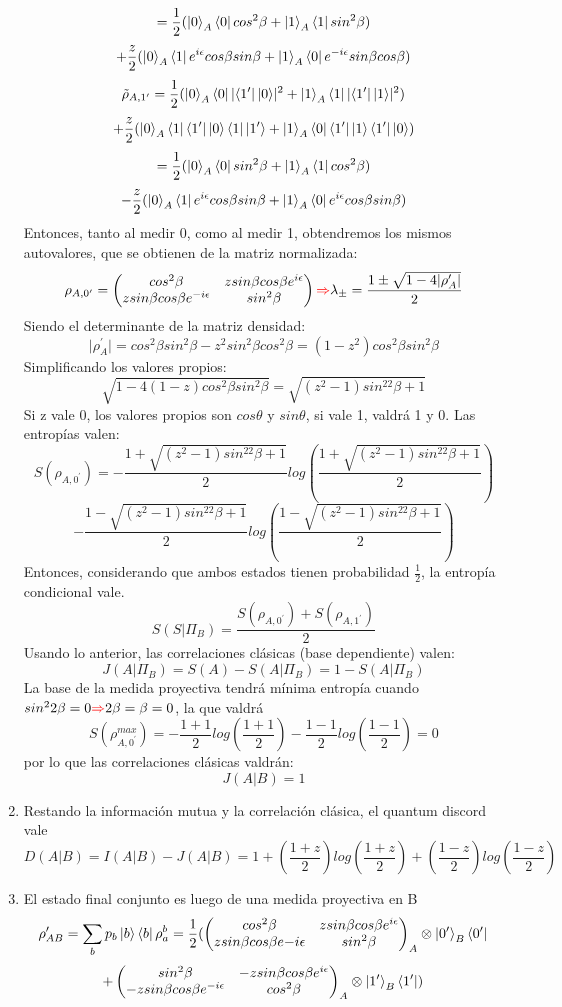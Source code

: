 \documentclass{book}
\begin{document}
\begin{enumerate}
       $$=\frac{1}{2}(\ket{0}_A\bra{0}cos^2\beta+\ket{1}_A\bra{1}sin^2\beta)$$ $$+\frac{z}{2}(\ket{0}_A\bra{1}e^{i\epsilon}cos\beta sin\beta+\ket{1}_A\bra{0}e^{-i\epsilon}sin\beta cos\beta)$$
    $$\Tilde{\rho}_{A,1^\prime}=\frac{1}{2}(\ket{0}_A\bra{0}\lvert\bra{1^\prime}\ket{0}\rvert^2+\ket{1}_A\bra{1}\lvert\bra{1^\prime}\ket{1}\rvert^2)$$ $$+\frac{z}{2}(\ket{0}_A\bra{1}\bra{1^\prime}\ket{0}\bra{1}\ket{1^\prime}+\ket{1}_A\bra{0}\bra{1^\prime}\ket{1}\bra{1^\prime}\ket{0})$$
    $$=\frac{1}{2}(\ket{0}_A\bra{0}sin^2\beta+\ket{1}_A\bra{1}cos^2\beta)$$ $$-\frac{z}{2}(\ket{0}_A\bra{1}e^{i\epsilon}cos\beta sin\beta+\ket{1}_A\bra{0}e^{i\epsilon}cos\beta sin\beta)$$
    Entonces, tanto al medir 0, como al medir 1, obtendremos los mismos autovalores, que se obtienen de la matriz normalizada: 
    $$ \rho_{A,0^\prime}= \begin{pmatrix} cos^2 \beta& zsin\beta cos\beta e^{i\epsilon} \\ z sin\beta cos\beta e^{-i\epsilon} & sin^2\beta\end{pmatrix}\textcolor{red}{\Rightarrow} \lambda_\pm=\frac{1\pm\sqrt{1-4\lvert\rho^\prime_A\rvert}}{2}$$
    Siendo el determinante de la matriz densidad:
    $$ \lvert\rho^\prime_A\rvert=cos^2\beta sin^2\beta-z^2sin^2\beta cos^2\beta=(1-z^2)cos^2\beta sin^2\beta$$ Simplificando los valores propios: $$ \sqrt{1-4(1-z)cos^2\beta sin^2\beta}=\sqrt{(z^2-1)sin^22\beta+1}$$
    Si z vale 0, los valores propios son $cos\theta$ y $sin\theta$, si vale 1, valdrá 1 y 0. Las entropías valen: $$S(\rho_{A,0^\prime})=-\frac{1+\sqrt{(z^2-1)sin^22\beta+1}}{2}log(\frac{1+\sqrt{(z^2-1)sin^22\beta+1}}{2})$$ $$-\frac{1-\sqrt{(z^2-1)sin^22\beta+1}}{2}log(\frac{1-\sqrt{(z^2-1)sin^22\beta+1}}{2}) $$
    Entonces, considerando que ambos estados tienen probabilidad $\frac{1}{2}$, la entropía condicional vale. $$S(S|\Pi_B)=\frac{S(\rho_{A,0^\prime})+S(\rho_{A,1^\prime})}{2}$$
    Usando lo anterior, las correlaciones clásicas (base dependiente) valen: 
    $$J(A|\Pi_B)=S(A)-S(A|\Pi_B)=1-S(A|\Pi_B)$$ 
    La base de la medida proyectiva tendrá mínima entropía cuando $sin^2 2\beta=0 \textcolor{red}{\Rightarrow} 2\beta=\beta=0$, la que valdrá
    $$S(\rho_{A,0^\prime}^{max})=-\frac{1+1}{2}log(\frac{1+1}{2})-\frac{1-1}{2}log(\frac{1-1}{2})=0$$por lo que las correlaciones clásicas valdrán:
    $$J(A|B)=1$$
    \item Restando la información mutua y la correlación clásica, el quantum discord vale $$D(A|B)=I(A|B)-J(A|B)=1+(\frac{1+z}{2})log(\frac{1+z}{2})+(\frac{1-z}{2})log(\frac{1-z}{2})$$ 
    \item El estado final conjunto es luego de una medida proyectiva en B $$\rho^\prime_{AB}=\sum_b p_b \ket{b}\bra{b}\rho_a^b=\frac{1}{2}(\begin{pmatrix}cos^2\beta&zsin\beta cos\beta e^{i\epsilon}\\zsin\beta cos\beta e {-i\epsilon}&sin^2\beta\end{pmatrix}_A\otimes\ket{0^\prime}_B\bra{0^\prime}$$ $$+\begin{pmatrix}sin^2\beta&-zsin\beta cos\beta e^{i\epsilon}\\-zsin\beta cos\beta e^{-i\epsilon}&cos^2\beta\end{pmatrix}_A\otimes\ket{1^\prime}_B\bra{1^\prime})$$

\end{enumerate}
\end{document}
